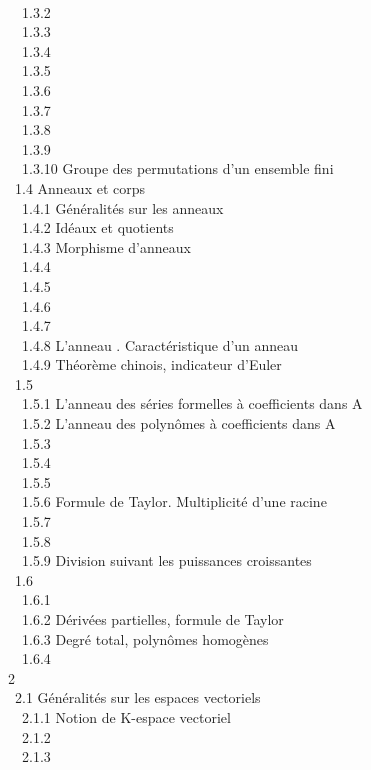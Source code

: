 \documentclass[]{article}
\begin{document}
\\ ~~1.3.2  \\ ~~1.3.3
 \\
~~1.3.4  \\
~~1.3.5  \\ ~~1.3.6
 \\ ~~1.3.7
 \\ ~~1.3.8
 \\ ~~1.3.9
 \\
~~1.3.10 {Groupe des permutations
d'un ensemble fini} \\ ~1.4 {Anneaux et
corps} \\ ~~1.4.1 {Généralités sur
les anneaux} \\ ~~1.4.2 {Idéaux et
quotients} \\ ~~1.4.3 {Morphisme
d'anneaux} \\ ~~1.4.4  \\
~~1.4.5  \\ ~~1.4.6
 \\
~~1.4.7  \\
~~1.4.8 {L'anneau . Caractéristique
d'un anneau} \\ ~~1.4.9 {Théorème
chinois, indicateur d'Euler} \\ ~1.5
 \\ ~~1.5.1
{L'anneau des séries formelles à
coefficients dans A} \\ ~~1.5.2
{L'anneau des polynômes à
coefficients dans A} \\ ~~1.5.3
 \\
~~1.5.4  \\ ~~1.5.5
 \\
~~1.5.6 {Formule de Taylor.
Multiplicité d'une racine} \\ ~~1.5.7
 \\
~~1.5.8  \\
~~1.5.9 {Division suivant les
puissances croissantes} \\ ~1.6
 \\
~~1.6.1  \\ ~~1.6.2
{Dérivées partielles, formule de
Taylor} \\ ~~1.6.3 {Degré total,
polynômes homogènes} \\ ~~1.6.4
 \\ 2
 \\ ~2.1
{Généralités sur les espaces
vectoriels} \\ ~~2.1.1 {Notion de
K-espace vectoriel} \\ ~~2.1.2
 \\
~~2.1.3  \\
\end{document}
